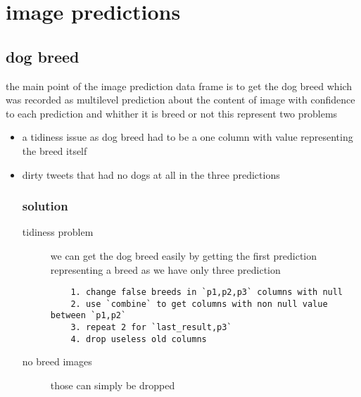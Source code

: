 \documentclass{article}
\begin{document}
\section{image predictions}
\subsection{dog breed}
the main point of the image prediction data frame is to get the dog breed which was recorded 
as multilevel prediction about the content of image with confidence to each prediction and 
whither it is breed or not this represent two problems
\begin{itemize}
	\item a tidiness issue as dog breed had to be a one column with value representing 
	      the breed itself 
	\item dirty tweets that had no dogs at all in the three predictions 
	      
	      \subsubsection{solution}
	      
	      \begin{description}
	      	\item[tidiness problem] we can get the dog breed easily by getting the first prediction representing a breed as we have only three prediction
	      	\begin{lstlisting}
    1. change false breeds in `p1,p2,p3` columns with null
    2. use `combine` to get columns with non null value between `p1,p2`
    3. repeat 2 for `last_result,p3`
    4. drop useless old columns 
	      	\end{lstlisting}
	      	
	      	\item[no breed images] those can simply be dropped
	      \end{description}
	      
\end{itemize}
\end{document}
